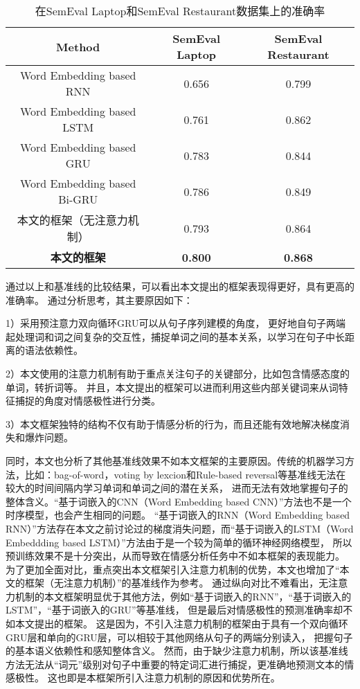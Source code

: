 \begin{table}
\centering
\caption{在SemEval Laptop和SemEval Restaurant数据集上的准确率}
\label{Table:Table3}
\begin{tabular}{@{}ccc@{}}
\hline
Method                       & SemEval Laptop & SemEval Restaurant \\ \hline
Word Embedding based RNN     & 0.656          & 0.799              \\
Word Embedding based LSTM    & 0.761          & 0.862              \\
Word Embedding based GRU     & 0.783          & 0.844              \\
Word Embedding based Bi-GRU  & 0.786          & 0.849              \\
本文的框架（无注意力机制）       & 0.793          & 0.864              \\
\textbf{本文的框架}       & \textbf{0.800} & \textbf{0.868}     \\ \hline
\end{tabular}
\end{table}

通过以上和基准线的比较结果，可以看出本文提出的框架表现得更好，具有更高的准确率。
通过分析思考，其主要原因如下：

1）采用预注意力双向循环GRU可以从句子序列建模的角度，
    更好地自句子两端起处理词和词之间复杂的交互性，捕捉单词之间的基本关系，以学习在句子中长距离的语法依赖性。

2）本文使用的注意力机制有助于重点关注句子的关键部分，比如包含情感态度的单词，转折词等。
    并且，本文提出的框架可以进而利用这些内部关键词来从词特征捕捉的角度对情感极性进行分类。
    
3）本文框架独特的结构不仅有助于情感分析的行为，而且还能有效地解决梯度消失和爆炸问题。

同时，本文也分析了其他基准线效果不如本文框架的主要原因。传统的机器学习方法，比如：bag-of-word，voting by lexcion和Rule-based reversal等基准线无法在较大的时间间隔内学习单词和单词之间的潜在关系，
进而无法有效地掌握句子的整体含义。“基于词嵌入的CNN（Word Embedding based CNN）”方法也不是一个时序模型，也会产生相同的问题。
“基于词嵌入的RNN（Word Embedding based RNN）”方法存在本文之前讨论过的梯度消失问题，而“基于词嵌入的LSTM（Word Embeddding based LSTM）”方法由于是一个较为简单的循环神经网络模型，
所以预训练效果不是十分突出，从而导致在情感分析任务中不如本框架的表现能力。
为了更加全面对比，重点突出本文框架引入注意力机制的优势，本文也增加了“本文的框架（无注意力机制）”的基准线作为参考。
通过纵向对比不难看出，无注意力机制的本文框架明显优于其他方法，例如“基于词嵌入的RNN”，“基于词嵌入的LSTM”，“基于词嵌入的GRU”等基准线，
但是最后对情感极性的预测准确率却不如本文提出的框架。
这是因为，不引入注意力机制的框架由于具有一个双向循环GRU层和单向的GRU层，可以相较于其他网络从句子的两端分别读入，
把握句子的基本语义依赖性和感知整体含义。
然而，由于缺少注意力机制，所以该基准线方法无法从“词元”级别对句子中重要的特定词汇进行捕捉，更准确地预测文本的情感极性。
这也即是本框架所引入注意力机制的原因和优势所在。

